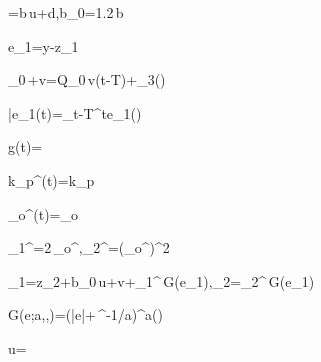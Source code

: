 %
%


=b\,u+d,\quad b_0=1.2\,b

e_1=y-z_1

\tau_0\,+v=Q_0\,v(t-T)+\beta_3\tanh\left(\right)


\bar{e}_1(t)=\int_{t-T}^{t}e_1(\tau)\,\tau

g(t)=

k_p^{}(t)=k_p\left[1+k_b\,g(t)\right]

\omega_o^{}(t)=\omega_o\left[1+a\,g(t)\right]

\beta_1^{}=2\,\omega_o^{},\quad \beta_2^{}=\left(\omega_o^{}\right)^2

_1=z_2+b_0\,u+v+\beta_1^{}\,G(e_1),\quad {}_2=\beta_2^{}\,G(e_1)

G(e;a,\delta,\lambda)=\left(\left|e\right|+\delta\,\lambda^{-1/a}\right)^{a}\tanh\left(\right)

u=

